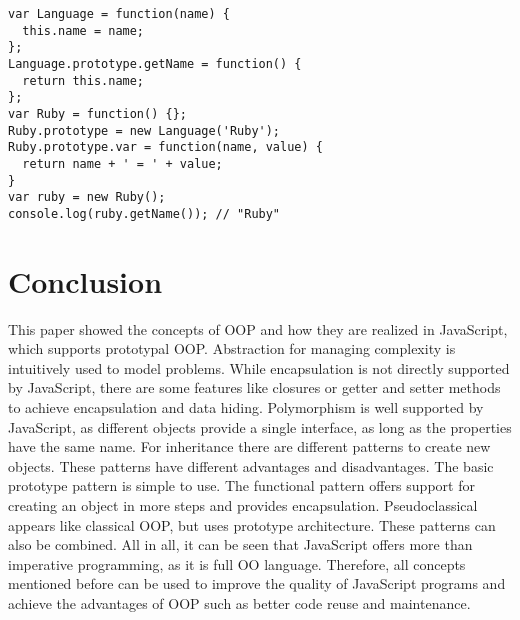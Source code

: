 \documentclass{bioinfo}
\begin{document}
\begin{lstlisting}
var Language = function(name) {
  this.name = name;
};
Language.prototype.getName = function() {
  return this.name;
};
var Ruby = function() {};
Ruby.prototype = new Language('Ruby');
Ruby.prototype.var = function(name, value) { 
  return name + ' = ' + value;
}
var ruby = new Ruby();
console.log(ruby.getName()); // "Ruby"

\end{lstlisting}



%
%

\section{Conclusion}
This paper showed the concepts of OOP and how they are realized in JavaScript, which supports prototypal OOP. Abstraction for managing complexity is intuitively used to model problems. While encapsulation is not directly supported by JavaScript, there are some features like closures or getter and setter methods to achieve encapsulation and data hiding. Polymorphism is well supported by JavaScript, as different objects provide a single interface, as long as the properties have the same name. For inheritance there are different patterns to create new objects. These patterns have different advantages and disadvantages. The basic prototype pattern is simple to use. The functional pattern offers support for creating an object in more steps and provides encapsulation. Pseudoclassical appears like classical OOP, but uses prototype architecture. These patterns can also be combined.
All in all, it can be seen that JavaScript offers more than imperative programming, as it is full OO language. Therefore, all concepts mentioned before can be used to improve the quality of JavaScript programs and achieve the advantages of OOP such as better code reuse and maintenance.
\end{document}
